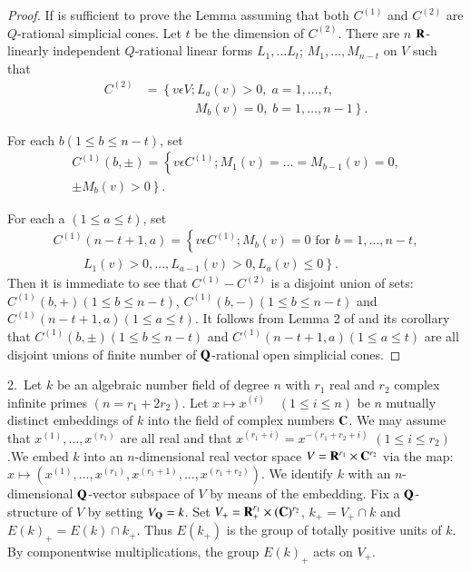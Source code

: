\begin{proof}
If is sufficient to prove the Lemma assuming that both $C^{(1)}$ and $C^{(2)}$ are $Q$-rational simplicial cones. Let $t$ be the dimension of $C^{(2)}$. There are $n$ $\mathbf{R}$-linearly independent $Q$-rational linear forms $L_1, \ldots L_t$; $M_1, \ldots, M_{n-t}$ on $V$ such that 
\begin{align*}
C^{(2)} & = \left\{ v \epsilon V; L_a (v) > 0,\; a = 1 , \ldots, t, \right. \\
& \qquad \qquad \left. M_b (v) = 0, \; b = 1, \ldots, n -1 \right\}.
\end{align*}

For each $b(1 \leqslant b \leqslant n -t)$, set
\begin{gather*}
C^{(1)} (b , \pm) = \left\{ v \epsilon C^{(1)}; M_1 (v) = \ldots = M_{b-1} (v) =0,  \right.\\
\left. \pm M_b (v) > 0\right\}.
\end{gather*}

\eject

For each a $(1 \leqslant a \leqslant t)$, set 
\begin{multline*}
 C^{(1)} (n-t+1,a)
=\left\{v \epsilon C^{(1)}; M_b (v) = 0 \text{ for } b = 1, \ldots, n -t ,\right.\\
 \hspace{1cm} \left. L_1 (v) > 0, \ldots, L_{a-1} (v) > 0, L_a (v) \leqslant 0\right\}.
\end{multline*}
Then it is immediate to see that $C^{(1)} - C^{(2)}$ is a disjoint union of sets: $C^{(1)} (b, +) (1 \leqslant b \leqslant n -t)$, $C^{(1)} (b,-) (1 \leqslant b \leqslant n -t)$ and $C^{(1)} (n-t+1, a) (1\leqslant a \leqslant t)$. It follows from Lemma 2 of \cite{art8-1} and its corollary that $C^{(1)} (b, \pm) (1 \leqslant b \leqslant n -t)$ and $C^{(1)} (n - t + 1, a) (1\leqslant a \leqslant t)$ are all disjoint unions of finite number of $\mathbf{Q}$-rational open simplicial cones. 
\end{proof}

2.~Let $k$ be an algebraic number field of degree $n$ with $r_1$ real and $r_2$ complex infinite primes $(n = r_1 + 2 r_2)$. Let $x \mapsto x^{(i)} \quad (1 \leqslant  i \leqslant n)$ be $n$ mutually distinct embeddings of $k$ into the field of complex numbers $\mathbf{C}$. We may assume that $x^{(1)}, \ldots, x^{(r_1)}$ are all real and that $x^{(r_1+i)} = x^{-(r_1+r_2 + i)}$ $(1 \leqslant i \leqslant r_2)$.\pageoriginale We embed $k$ into an $n$-dimensional real vector space $V = \mathbf{R}^{r_1} \times \mathbf{C}^{r_2}$ via the map: $x \longmapsto (x^{(1)}, \ldots, x^{(r_1)}, x^{(r_1 +1)}, \ldots, x^{(r_1 + r_2)})$. We identify $k$ with an $n$-dimensional $\mathbf{Q}$-vector subspace of $V$ by means of the embedding. Fix a $\mathbf{Q}$-structure of $V$ by setting $V_{\mathbf{Q}} = k$. Set $V_+ = \mathbf{R}^{r_1}_+ \times (\mathbf{C})^{r_2}$, $k_+ = V_+ \cap k$ and $E(k)_+ = E (k) \cap k_+$. Thus $E(k_+)$ is the group of totally positive units of $k$. By componentwise multiplications, the group $E(k)_+$ acts on $V_+$.

